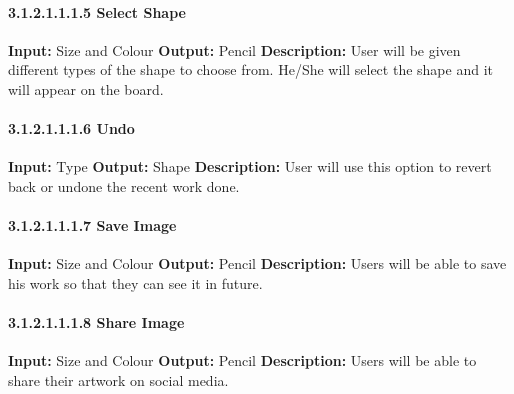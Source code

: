 \documentclass{scrreprt}
\begin{document}
\paragraph{3.1.2.1.1.1.5 Select Shape}
\hfill \vspace{2.5mm} \break 
\textbf{Input:} Size and Colour \newline
\textbf{Output:} Pencil
\vspace{1mm}\newline
\textbf{Description:} \newline 
User will be given different types of the shape to choose from. He/She will select the shape and it will appear on the board.

\paragraph{3.1.2.1.1.1.6 Undo}
\hfill \vspace{2.5mm} \break 
\textbf{Input:} Type \newline
\textbf{Output:} Shape
\vspace{1mm}\newline
\textbf{Description:} \newline 
User will use this option to revert back or undone the recent work done.

\paragraph{3.1.2.1.1.1.7 Save Image}
\hfill \vspace{2.5mm} \break 
\textbf{Input:} Size and Colour \newline
\textbf{Output:} Pencil
\vspace{1mm}\newline
\textbf{Description:} \newline 
Users will be able to save his work so that they can see it in future.

\paragraph{3.1.2.1.1.1.8 Share Image}
\hfill \vspace{2.5mm} \break 
\textbf{Input:} Size and Colour \newline
\textbf{Output:} Pencil
\vspace{1mm}\newline
\textbf{Description:} \newline 
Users will be able to share their artwork on social media.
\end{document}
